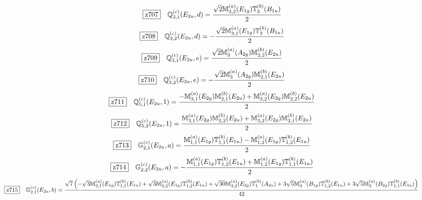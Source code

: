 \documentclass[fleqn,10pt,landscape]{jsarticle}
\begin{document}
\begin{dmath*}
\hspace*{3mm}\fbox{z707}\quad \mathbb{Q}_{3,1}^{(c)}(E_{2u},d)=\frac{\sqrt{2} \mathbb{M}_{3,2}^{(a)}(E_{1g}) \mathbb{T}_{3}^{(b)}(B_{1u})}{2}
\end{dmath*}
\begin{dmath*}
\hspace*{3mm}\fbox{z708}\quad \mathbb{Q}_{3,2}^{(c)}(E_{2u},d)=- \frac{\sqrt{2} \mathbb{M}_{3,1}^{(a)}(E_{1g}) \mathbb{T}_{3}^{(b)}(B_{1u})}{2}
\end{dmath*}
\begin{dmath*}
\hspace*{3mm}\fbox{z709}\quad \mathbb{Q}_{3,1}^{(c)}(E_{2u},e)=\frac{\sqrt{2} \mathbb{M}_{3}^{(a)}(A_{2g}) \mathbb{M}_{2,2}^{(b)}(E_{2u})}{2}
\end{dmath*}
\begin{dmath*}
\hspace*{3mm}\fbox{z710}\quad \mathbb{Q}_{3,2}^{(c)}(E_{2u},e)=- \frac{\sqrt{2} \mathbb{M}_{3}^{(a)}(A_{2g}) \mathbb{M}_{2,1}^{(b)}(E_{2u})}{2}
\end{dmath*}
\begin{dmath*}
\hspace*{3mm}\fbox{z711}\quad \mathbb{Q}_{5,1}^{(c)}(E_{2u},1)=\frac{- \mathbb{M}_{3,1}^{(a)}(E_{2g}) \mathbb{M}_{2,1}^{(b)}(E_{2u}) + \mathbb{M}_{3,2}^{(a)}(E_{2g}) \mathbb{M}_{2,2}^{(b)}(E_{2u})}{2}
\end{dmath*}
\begin{dmath*}
\hspace*{3mm}\fbox{z712}\quad \mathbb{Q}_{5,2}^{(c)}(E_{2u},1)=\frac{\mathbb{M}_{3,1}^{(a)}(E_{2g}) \mathbb{M}_{2,2}^{(b)}(E_{2u}) + \mathbb{M}_{3,2}^{(a)}(E_{2g}) \mathbb{M}_{2,1}^{(b)}(E_{2u})}{2}
\end{dmath*}
\begin{dmath*}
\hspace*{3mm}\fbox{z713}\quad \mathbb{G}_{2,1}^{(c)}(E_{2u},a)=\frac{\mathbb{M}_{1,1}^{(a)}(E_{1g}) \mathbb{T}_{1,1}^{(b)}(E_{1u}) - \mathbb{M}_{1,2}^{(a)}(E_{1g}) \mathbb{T}_{1,2}^{(b)}(E_{1u})}{2}
\end{dmath*}
\begin{dmath*}
\hspace*{3mm}\fbox{z714}\quad \mathbb{G}_{2,2}^{(c)}(E_{2u},a)=- \frac{\mathbb{M}_{1,1}^{(a)}(E_{1g}) \mathbb{T}_{1,2}^{(b)}(E_{1u}) + \mathbb{M}_{1,2}^{(a)}(E_{1g}) \mathbb{T}_{1,1}^{(b)}(E_{1u})}{2}
\end{dmath*}
\begin{dmath*}
\hspace*{3mm}\fbox{z715}\quad \mathbb{G}_{2,1}^{(c)}(E_{2u},b)=\frac{\sqrt{7} \left(- \sqrt{3} \mathbb{M}_{3,1}^{(a)}(E_{1g}) \mathbb{T}_{1,1}^{(b)}(E_{1u}) + \sqrt{3} \mathbb{M}_{3,2}^{(a)}(E_{1g}) \mathbb{T}_{1,2}^{(b)}(E_{1u}) + \sqrt{30} \mathbb{M}_{3,2}^{(a)}(E_{2g}) \mathbb{T}_{1}^{(b)}(A_{2u}) + 3 \sqrt{5} \mathbb{M}_{3}^{(a)}(B_{1g}) \mathbb{T}_{1,2}^{(b)}(E_{1u}) + 3 \sqrt{5} \mathbb{M}_{3}^{(a)}(B_{2g}) \mathbb{T}_{1,1}^{(b)}(E_{1u})\right)}{42}
\end{dmath*}
\end{document}
